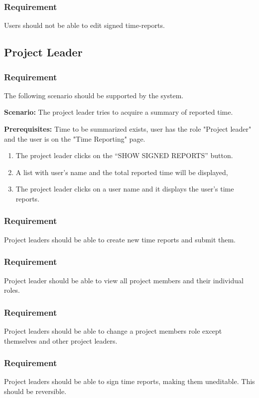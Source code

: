 \documentclass{article}
\begin{document}
\subsubsection{Requirement}
Users should not be able to edit signed time-reports.

\subsection{Project Leader}
\subsubsection{Requirement}
The following scenario should be supported by the system.

\textbf{Scenario:} The project leader tries to acquire a summary of reported time.

\textbf{Prerequisites:} Time to be summarized exists, user has the role "Project leader" and the user is on the "Time Reporting" page.

\begin{enumerate}
    \item The project leader clicks on the “SHOW SIGNED REPORTS” button.
    \item A list with user’s name and the total reported time will be displayed,
    \item The project leader clicks on a user name and it displays the user’s time reports.
\end{enumerate}

\subsubsection{Requirement}
Project leaders should be able to create new time reports and submit them.

\subsubsection{Requirement}
Project leader should be able to view all project members and their individual roles.


\subsubsection{Requirement}
Project leaders should be able to change a project members role except themselves and other project leaders.

\subsubsection{Requirement}
Project leaders should be able to sign time reports, making them uneditable. This should be reversible.
\end{document}

